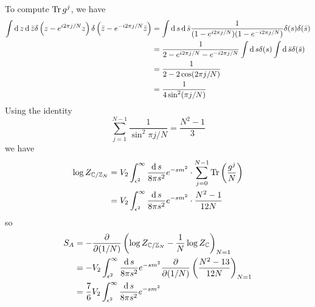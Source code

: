 \subsection{}
To compute $\operatorname{Tr} g^j$, we have
\begin{equation}
	 \begin{split}
	 \int \operatorname{d} z \operatorname{d} \bar{z} \delta\left(z-e^{i 2\pi j/N}z\right) \delta \left(\bar{z} - e^{-i2\pi j/N}\bar{z} \right)&= \int \operatorname{d} s \operatorname{d}\bar{s} \frac{1}{(1- e^{i 2\pi j/N})(1-e^{-i 2\pi j/N})} \delta(s) \delta(\bar{s})\\
	 &= \frac{1}{2- e^{i 2\pi j/N}-e^{-i 2\pi j/N}} \int \operatorname{d} s \delta(s)\int \operatorname{d}\bar{s} \delta(\bar{s})\\
	 & = \frac{1}{2- 2\cos(2\pi j/N)}\\
	 & =\frac{1}{4 \sin^2 (\pi j/N) }
	 \end{split}
\end{equation}
Using the identity
\[
\sum_{j=1}^{N-1} \frac{1}{\sin^2 \pi j/N} = \frac{N^2-1}{3}
\] 
we have 
\begin{equation}
	\begin{split}
	\log Z_{\mathbb{C}/\mathbb{Z}_N}& = V_2 \int_{\epsilon^2}^{\infty} \frac{\operatorname{d} s}{8 \pi s^2} e^{-sm^2} \cdot \sum_{j=0}^{N-1} \operatorname{Tr} \left( \frac{g^j}{N} \right)\\
	& = V_2 \int_{\epsilon^2}^{\infty} \frac{\operatorname{d} s}{8 \pi s^2} e^{-sm^2} \cdot\frac{N^2-1}{12N}
	\end{split}
\end{equation}
so
\begin{equation}
	\begin{split}
	S_A & = -\frac{\partial}{\partial (1/N)} \left(\log Z_{\mathbb{C}/\mathbb{Z}_N} - \frac{1}{N} \log Z_{\mathbb{C}} \right)_{N=1}\\
	& = - V_2 \int_{\epsilon^2}^{\infty} \frac{\operatorname{d} s}{8 \pi s^2} e^{-sm^2}\frac{\partial}{\partial (1/N)}\left( \frac{N^2-13}{12N} \right)_{N=1}\\
	& = \frac{7}{6} V_2 \int_{\epsilon^2}^{\infty} \frac{\operatorname{d} s}{8 \pi s^2} e^{-sm^2}
	\end{split}
\end{equation}